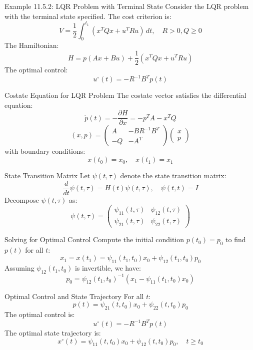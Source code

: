 \documentclass[10pt]{beamer}
\begin{document}
\begin{frame}[fragile]{Example 11.5.2: LQR Problem with Terminal State}
  Consider the LQR problem with the terminal state specified. The cost criterion is:
  \[
  V = \frac{1}{2} \int_0^{t_1} (x^T Q x + u^T R u) \, dt, \quad R > 0, Q \ge 0
  \]
  The Hamiltonian:
  \[
  H = p (A x + B u) + \frac{1}{2} (x^T Q x + u^T R u)
  \]
  The optimal control:
  \[
  u^\circ(t) = -R^{-1} B^T p(t)
  \]
\end{frame}
  
\begin{frame}[fragile]{Costate Equation for LQR Problem}
  The costate vector satisfies the differential equation:
  \[
  \dot{p}(t) = -\frac{\partial H}{\partial x} = -p^T A - x^T Q
  \]
  \[
  (x, p) = \begin{pmatrix}
  A & -BR^{-1}B^T \\
  -Q & -A^T
  \end{pmatrix} \begin{pmatrix}
  x \\
  p
  \end{pmatrix}
  \]
  with boundary conditions:
  \[
  x(t_0) = x_0, \quad x(t_1) = x_1
  \]
\end{frame}
  
\begin{frame}[fragile]{State Transition Matrix}
  Let \( \psi(t, \tau) \) denote the state transition matrix:
  \[
  \frac{d}{dt} \psi(t, \tau) = H(t) \psi(t, \tau), \quad \psi(t, t) = I
  \]
  Decompose \( \psi(t, \tau) \) as:
  \[
  \psi(t, \tau) = \begin{pmatrix}
  \psi_{11}(t, \tau) & \psi_{12}(t, \tau) \\
  \psi_{21}(t, \tau) & \psi_{22}(t, \tau)
  \end{pmatrix}
  \]
\end{frame}
  
\begin{frame}[fragile]{Solving for Optimal Control}
  Compute the initial condition \( p(t_0) = p_0 \) to find \( p(t) \) for all \( t \):
  \[
  x_1 = x(t_1) = \psi_{11}(t_1, t_0) x_0 + \psi_{12}(t_1, t_0) p_0
  \]
  Assuming \( \psi_{12}(t_1, t_0) \) is invertible, we have:
  \[
  p_0 = \psi_{12}(t_1, t_0)^{-1} (x_1 - \psi_{11}(t_1, t_0) x_0)
  \]
\end{frame}
  
\begin{frame}[fragile]{Optimal Control and State Trajectory}
  For all \( t \):
  \[
  p(t) = \psi_{21}(t, t_0) x_0 + \psi_{22}(t, t_0) p_0
  \]
  The optimal control is:
  \[
  u^\circ(t) = -R^{-1} B^T p(t)
  \]
  The optimal state trajectory is:
  \[
  x^\circ(t) = \psi_{11}(t, t_0) x_0 + \psi_{12}(t, t_0) p_0, \quad t \ge t_0
  \]
\end{frame}
  
\end{document}
